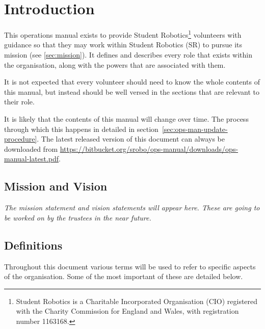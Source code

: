 \chapter{Introduction}

This operations manual exists to provide Student Robotics\footnote{Student Robotics is a Charitable Incorporated Organisation (CIO) registered with the Charity Commission for England and Wales, with registration number 1163168.} volunteers with guidance so that they may work within Student Robotics (SR) to pursue its mission (see \autoref{sec:mission}).  It defines and describes every role that exists within the organisation, along with the powers that are associated with them.

It is not expected that every volunteer should need to know the whole contents of this manual, but instead should be well versed in the sections that are relevant to their role.

It is likely that the contents of this manual will change over time.  The process through which this happens in detailed in section~\ref{sec:ops-man-update-procedure}.  The latest released version of this document can always be downloaded from \url{https://bitbucket.org/srobo/ops-manual/downloads/ops-manual-latest.pdf}.


\section{Mission and Vision}
\label{sec:mission}

\textit{The mission statement and vision statements will appear here.  These are going to be worked on by the trustees in the near future.}

\section{Definitions}

Throughout this document various terms will be used to refer to specific aspects of the organisation. Some of the most important of these are detailed below.

